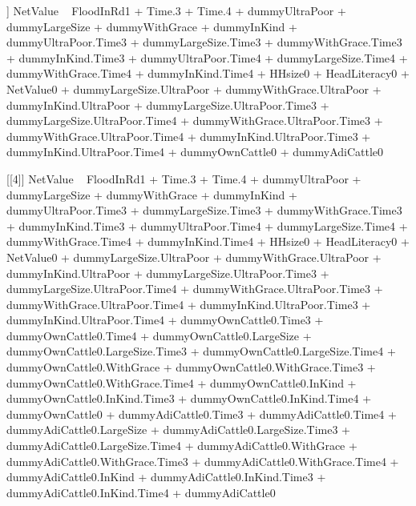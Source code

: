 \begin{Schunk}
\begin{Soutput}
[[3]]
NetValue ~ FloodInRd1 + Time.3 + Time.4 + dummyUltraPoor + dummyLargeSize + 
    dummyWithGrace + dummyInKind + dummyUltraPoor.Time3 + dummyLargeSize.Time3 + 
    dummyWithGrace.Time3 + dummyInKind.Time3 + dummyUltraPoor.Time4 + 
    dummyLargeSize.Time4 + dummyWithGrace.Time4 + dummyInKind.Time4 + 
    HHsize0 + HeadLiteracy0 + NetValue0 + dummyLargeSize.UltraPoor + 
    dummyWithGrace.UltraPoor + dummyInKind.UltraPoor + dummyLargeSize.UltraPoor.Time3 + 
    dummyLargeSize.UltraPoor.Time4 + dummyWithGrace.UltraPoor.Time3 + 
    dummyWithGrace.UltraPoor.Time4 + dummyInKind.UltraPoor.Time3 + 
    dummyInKind.UltraPoor.Time4 + dummyOwnCattle0 + dummyAdiCattle0

[[4]]
NetValue ~ FloodInRd1 + Time.3 + Time.4 + dummyUltraPoor + dummyLargeSize + 
    dummyWithGrace + dummyInKind + dummyUltraPoor.Time3 + dummyLargeSize.Time3 + 
    dummyWithGrace.Time3 + dummyInKind.Time3 + dummyUltraPoor.Time4 + 
    dummyLargeSize.Time4 + dummyWithGrace.Time4 + dummyInKind.Time4 + 
    HHsize0 + HeadLiteracy0 + NetValue0 + dummyLargeSize.UltraPoor + 
    dummyWithGrace.UltraPoor + dummyInKind.UltraPoor + dummyLargeSize.UltraPoor.Time3 + 
    dummyLargeSize.UltraPoor.Time4 + dummyWithGrace.UltraPoor.Time3 + 
    dummyWithGrace.UltraPoor.Time4 + dummyInKind.UltraPoor.Time3 + 
    dummyInKind.UltraPoor.Time4 + dummyOwnCattle0.Time3 + dummyOwnCattle0.Time4 + 
    dummyOwnCattle0.LargeSize + dummyOwnCattle0.LargeSize.Time3 + 
    dummyOwnCattle0.LargeSize.Time4 + dummyOwnCattle0.WithGrace + 
    dummyOwnCattle0.WithGrace.Time3 + dummyOwnCattle0.WithGrace.Time4 + 
    dummyOwnCattle0.InKind + dummyOwnCattle0.InKind.Time3 + dummyOwnCattle0.InKind.Time4 + 
    dummyOwnCattle0 + dummyAdiCattle0.Time3 + dummyAdiCattle0.Time4 + 
    dummyAdiCattle0.LargeSize + dummyAdiCattle0.LargeSize.Time3 + 
    dummyAdiCattle0.LargeSize.Time4 + dummyAdiCattle0.WithGrace + 
    dummyAdiCattle0.WithGrace.Time3 + dummyAdiCattle0.WithGrace.Time4 + 
    dummyAdiCattle0.InKind + dummyAdiCattle0.InKind.Time3 + dummyAdiCattle0.InKind.Time4 + 
    dummyAdiCattle0


\end{Soutput}
\end{Schunk}
